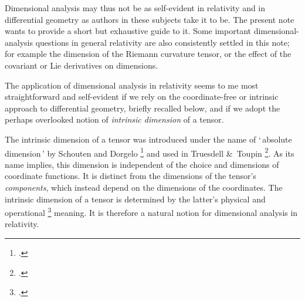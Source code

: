 \documentclass[\ifafour a4paper,12pt,\else a5paper,10pt,\fi%
onecolumn,oneside,article,%
british%
]{memoir}
\newcommand*{\defquote}[1]{`\,#1\,'}
\theoremstyle{remark}
\theoremstyle{innote}
\newcommand*{\citep}{\footcites}
\newcommand*{\amp}{\&}
\renewcommand*{\|}[1][]{\nonscript\,#1\vert\nonscript\;\mathopen{}}
\newcommand*{\chap}{ch.}%
\begin{document}
\medskip

Dimensional analysis may thus not be as self-evident in relativity and in
differential geometry as authors in these subjects take it to be. The
present note wants to provide a short but exhaustive guide to it.
Some important dimensional-analysis questions in general relativity are
also consistently settled in this note; for example the dimension of the
Riemann curvature tensor, or the effect of the covariant or Lie derivatives
on dimensions.

The application of dimensional analysis in relativity seems to me most
straightforward and self-evident if we rely on the coordinate-free or
intrinsic approach to differential geometry, briefly recalled below, and if
we adopt the perhaps overlooked notion of \emph{intrinsic dimension} of a
tensor. %

The intrinsic dimension of a tensor was
introduced under the name of \defquote{absolute dimension} by Schouten and
Dorgelo \citep{dorgeloetal1946}[\chap~VI]{schouten1951_r1989} and used in
Truesdell \amp\ Toupin \citep[Appendix II]{truesdelletal1960}. As its name
implies, this dimension is independent of the choice and dimensions of
coordinate functions. It is distinct from the dimensions of the tensor's
\emph{components}, which instead depend on the dimensions of the
coordinates. The intrinsic dimension of a tensor is determined by the
latter's physical and operational \citep{bridgman1927_r1958} meaning. It is
therefore a natural notion for dimensional analysis in relativity.

\medskip
\end{document}
